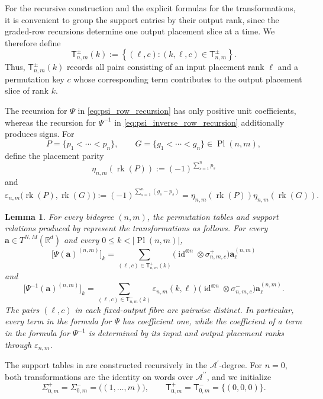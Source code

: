 \documentclass{amsart}
\newtheorem{lemma}[theorem]{Lemma}
\theoremstyle{definition}
\theoremstyle{remark}
\begin{document}
For the recursive construction and the explicit formulas for the
transformations, it is convenient to group the support entries by their
output rank, since the graded-row recursions determine one output placement
slice at a time. We therefore define
\[
    \mathsf{T}^{\pm}_{n,m}(k)
    :=
    \left\{
        (\ell,c):
        (k,\ell,c)\in\mathsf{T}^{\pm}_{n,m}
    \right\}.
\]
Thus, $\mathsf{T}^{\pm}_{n,m}(k)$ records all pairs consisting of an input
placement rank $\ell$ and a permutation key $c$ whose corresponding term
contributes to the output placement slice of rank $k$.

The recursion for $\Psi$ in
\eqref{eq:psi_row_recursion} has only positive unit coefficients, whereas
the recursion for $\Psi^{-1}$ in
\eqref{eq:psi_inverse_row_recursion} additionally produces signs. For
\[
    P=\{p_1<\cdots<p_n\},
    \qquad
    G=\{g_1<\cdots<g_n\}
    \in
    \operatorname{Pl}(n,m),
\]
define the placement parity
\[
    \eta_{n,m}(\operatorname{rk}(P))
    :=
    (-1)^{\sum_{s=1}^{n}p_s}
\]
and
\[
    \varepsilon_{n,m}
    \bigl(
        \operatorname{rk}(P),
        \operatorname{rk}(G)
    \bigr)
    :=
    (-1)^{\sum_{s=1}^{n}(g_s-p_s)}
    =
    \eta_{n,m}(\operatorname{rk}(P))
    \eta_{n,m}(\operatorname{rk}(G)).
\]

\begin{lemma}
\label{lem:psi_support_formula}
For every bidegree $(n,m)$, the permutation tables and support relations
produced by
represent the transformations as follows. For every
$\mathbf{a}\in T^{N,M}(\mathbb{R}^d)$ and every
$0\leq k<|\operatorname{Pl}(n,m)|$,
\[
    \bigl[
        \Psi(\mathbf{a})^{(n,m)}
    \bigr]_k
    =
    \sum_{(\ell,c)\in\mathsf{T}^{+}_{n,m}(k)}
    \bigl(
        \operatorname{id}^{\otimes n}
        \otimes\sigma^{+}_{n,m,c}
    \bigr)
    \mathbf{a}^{(n,m)}_\ell
\]
and
\[
    \bigl[
        \Psi^{-1}(\mathbf{a})^{(n,m)}
    \bigr]_k
    =
    \sum_{(\ell,c)\in\mathsf{T}^{-}_{n,m}(k)}
    \varepsilon_{n,m}(k,\ell)
    \bigl(
        \operatorname{id}^{\otimes n}
        \otimes\sigma^{-}_{n,m,c}
    \bigr)
    \mathbf{a}^{(n,m)}_\ell.
\]
The pairs $(\ell,c)$ in each fixed-output fibre are pairwise distinct.
In particular, every term in the formula for $\Psi$ has coefficient one,
while the coefficient of a term in the formula for
$\Psi^{-1}$ is determined by its input and output placement ranks through
$\varepsilon_{n,m}$.
\end{lemma}

The support tables in
 are constructed recursively in the
$\mathcal{A}^{\prime}$-degree. For $n=0$, both transformations are the
identity on words over $\mathcal{A}^{\prime\prime}$, and we initialize
\[
    \Sigma^{+}_{0,m}
    =
    \Sigma^{-}_{0,m}
    =
    \bigl((1,\ldots,m)\bigr),
    \qquad
    \mathsf{T}^{+}_{0,m}
    =
    \mathsf{T}^{-}_{0,m}
    =
    \{(0,0,0)\}.
\]
\end{document}
